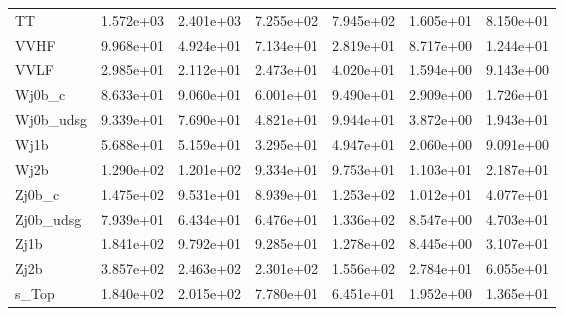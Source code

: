 \begin{table}
{\begin{tabularx}{\textwidth}{|X|X|X|X|X|X|X|}
\hline
TT & 1.572e+03 & 2.401e+03 & 7.255e+02 & 7.945e+02 & 1.605e+01 & 8.150e+01 \\
VVHF & 9.968e+01 & 4.924e+01 & 7.134e+01 & 2.819e+01 & 8.717e+00 & 1.244e+01 \\
VVLF & 2.985e+01 & 2.112e+01 & 2.473e+01 & 4.020e+01 & 1.594e+00 & 9.143e+00 \\
Wj0b\_c & 8.633e+01 & 9.060e+01 & 6.001e+01 & 9.490e+01 & 2.909e+00 & 1.726e+01 \\
Wj0b\_udsg & 9.339e+01 & 7.690e+01 & 4.821e+01 & 9.944e+01 & 3.872e+00 & 1.943e+01 \\
Wj1b & 5.688e+01 & 5.159e+01 & 3.295e+01 & 4.947e+01 & 2.060e+00 & 9.091e+00 \\
Wj2b & 1.290e+02 & 1.201e+02 & 9.334e+01 & 9.753e+01 & 1.103e+01 & 2.187e+01 \\
Zj0b\_c & 1.475e+02 & 9.531e+01 & 8.939e+01 & 1.253e+02 & 1.012e+01 & 4.077e+01 \\
Zj0b\_udsg & 7.939e+01 & 6.434e+01 & 6.476e+01 & 1.336e+02 & 8.547e+00 & 4.703e+01 \\
Zj1b & 1.841e+02 & 9.792e+01 & 9.285e+01 & 1.278e+02 & 8.445e+00 & 3.107e+01 \\
Zj2b & 3.857e+02 & 2.463e+02 & 2.301e+02 & 1.556e+02 & 2.784e+01 & 6.055e+01 \\
s\_Top & 1.840e+02 & 2.015e+02 & 7.780e+01 & 6.451e+01 & 1.952e+00 & 1.365e+01 \\
\hline
\end{tabularx}
}
\label{tab:sr-Znn-2017}
\end{table}

